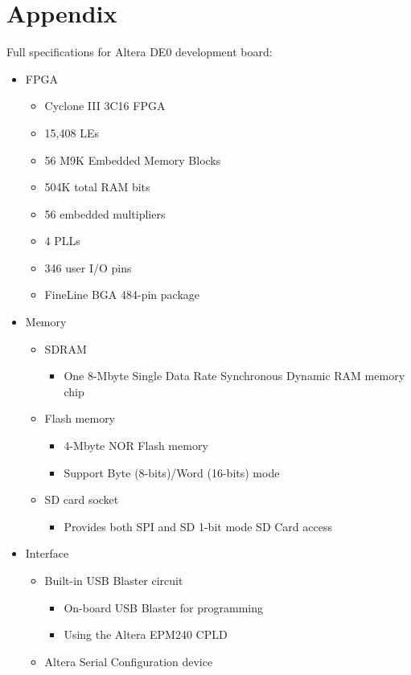 \documentclass[twoside]{article}
\begin{document}
\section{Appendix}
Full specifications for Altera DE0 development board: 
\begin{itemize}
\item FPGA
	\begin{itemize}
 	\item Cyclone III 3C16 FPGA
	\item 15,408 LEs
	\item 56 M9K Embedded Memory Blocks
	\item 504K total RAM bits
	\item 56 embedded multipliers
	\item 4 PLLs
	\item 346 user I/O pins
	\item FineLine BGA 484-pin package
	\end{itemize}
\item Memory
	\begin{itemize}
	\item SDRAM
		\begin{itemize}
		\item One 8-Mbyte Single Data Rate Synchronous Dynamic RAM memory chip
		\end{itemize}
	\item Flash memory
		\begin{itemize}
		\item 4-Mbyte NOR Flash memory
		\item Support Byte (8-bits)/Word (16-bits) mode
		\end{itemize}
	\item SD card socket
		\begin{itemize}
		\item Provides both SPI and SD 1-bit mode SD Card access
		\end{itemize}
	\end{itemize}
\item Interface
	\begin{itemize}
	\item Built-in USB Blaster circuit
		\begin{itemize}
	 	\item On-board USB Blaster for programming
		\item Using the Altera EPM240 CPLD
		\end{itemize}
	\item Altera Serial Configuration device
		\begin{itemize}

\end{itemize}
\end{itemize}
\end{itemize}
\end{document}
